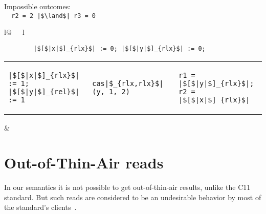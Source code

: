 \begin{minipage}[t]{0.3\linewidth}
Impossible outcomes:\\
\lstinline{  r2 = 2 |$\land$| r3 = 0}\\
\end{minipage}
%
\begin{minipage}[t]{0.3\linewidth}
\vspace{-.2cm}
  \begin{tabular}{l@{\ \ \ }l}
    \begin{minipage}[l]{4.3cm} \small
\begin{lstlisting}
        |$[$|x|$]_{rlx}$| := 0; |$[$|y|$]_{rlx}$| := 0;
\end{lstlisting}
\vspace{-.2cm}
\begin{tabular}{l||l||l}
\begin{lstlisting}
|$[$|x|$]_{rlx}$| := 1;
|$[$|y|$]_{rel}$| := 1
\end{lstlisting}
\hspace{.6cm}
&
\begin{lstlisting}
cas|$_{rlx,rlx}$|(y, 1, 2)
\end{lstlisting}
\hspace{.6cm}
&
\begin{lstlisting}
r1 = |$[$|y|$]_{rlx}$|;
r2 = |$[$|x|$]_{rlx}$|
\end{lstlisting}
\end{tabular}
    \end{minipage}
&
  \end{tabular}
\end{minipage}
\litmusTestEnd



\section{Out-of-Thin-Air reads}
\label{app:ota}

In our semantics it is not possible to get out-of-thin-air results,
unlike the C11 standard. But such reads are considered to be an
undesirable behavior by most of the standard's
clients~\cite{Batty-al:ESOP15}.

